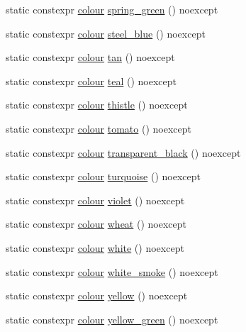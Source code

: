 \begin{DoxyCompactItemize}
\item 
static constexpr \mbox{\hyperlink{classmoka_1_1colour}{colour}} \mbox{\hyperlink{classmoka_1_1colour_a95eaa33785dd3aa5591e236410916e5d}{spring\+\_\+green}} () noexcept
\item 
static constexpr \mbox{\hyperlink{classmoka_1_1colour}{colour}} \mbox{\hyperlink{classmoka_1_1colour_a83ed36e0f5d8372078f46948743ee244}{steel\+\_\+blue}} () noexcept
\item 
static constexpr \mbox{\hyperlink{classmoka_1_1colour}{colour}} \mbox{\hyperlink{classmoka_1_1colour_ad3ddc53fc9a16b7d6bc46d59ce3715c1}{tan}} () noexcept
\item 
static constexpr \mbox{\hyperlink{classmoka_1_1colour}{colour}} \mbox{\hyperlink{classmoka_1_1colour_a4cf38120778f33cec9aaab9abd65b7c8}{teal}} () noexcept
\item 
static constexpr \mbox{\hyperlink{classmoka_1_1colour}{colour}} \mbox{\hyperlink{classmoka_1_1colour_a9783e6f125562a22a45330658763597d}{thistle}} () noexcept
\item 
static constexpr \mbox{\hyperlink{classmoka_1_1colour}{colour}} \mbox{\hyperlink{classmoka_1_1colour_ab4aaa71a65f87529dd18d088f4204559}{tomato}} () noexcept
\item 
static constexpr \mbox{\hyperlink{classmoka_1_1colour}{colour}} \mbox{\hyperlink{classmoka_1_1colour_a9b7dc38464956134c0fd56f4efcd69c8}{transparent\+\_\+black}} () noexcept
\item 
static constexpr \mbox{\hyperlink{classmoka_1_1colour}{colour}} \mbox{\hyperlink{classmoka_1_1colour_a011d812d61b7f9dbcf56a53454daa144}{turquoise}} () noexcept
\item 
static constexpr \mbox{\hyperlink{classmoka_1_1colour}{colour}} \mbox{\hyperlink{classmoka_1_1colour_a4c268c609b54c0fcb4e7dd9b288a5ed9}{violet}} () noexcept
\item 
static constexpr \mbox{\hyperlink{classmoka_1_1colour}{colour}} \mbox{\hyperlink{classmoka_1_1colour_a15e29561e4b6bd5157d2fbeb1c641172}{wheat}} () noexcept
\item 
static constexpr \mbox{\hyperlink{classmoka_1_1colour}{colour}} \mbox{\hyperlink{classmoka_1_1colour_a78d1ca0cbb00a90472e76c8841804db1}{white}} () noexcept
\item 
static constexpr \mbox{\hyperlink{classmoka_1_1colour}{colour}} \mbox{\hyperlink{classmoka_1_1colour_ae9bfa45ce6e6417ffb19b11c7461aa7d}{white\+\_\+smoke}} () noexcept
\item 
static constexpr \mbox{\hyperlink{classmoka_1_1colour}{colour}} \mbox{\hyperlink{classmoka_1_1colour_a0f1203d05495c876fd24160e9b5a3de2}{yellow}} () noexcept
\item 
static constexpr \mbox{\hyperlink{classmoka_1_1colour}{colour}} \mbox{\hyperlink{classmoka_1_1colour_ab108e0b2bf391a04c825c9612a48c998}{yellow\+\_\+green}} () noexcept
\end{DoxyCompactItemize}


